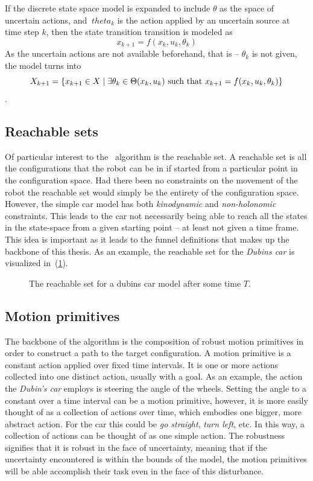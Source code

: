 If the discrete state space model is expanded to include \(\theta\) as the space
of uncertain actions, and \(\ theta_k\) is the action applied by an uncertain
source at time step \(k\), then the state transition transition is modeled as
\[
  x_{k+1} = f(x_k,u_k,\theta_k)
\]
As the uncertain actions are not available beforehand, that is -- \(\theta_ k\)
is not given, the model turns into
\[
  X_{k+1} = \lbrace x_{k+1} \in X \mid \exists\theta_k \in \Theta(x_k,u_k) \text{
      such that } x_{k+1} = f(x_k,u_k,\theta_k)\rbrace
\]\cite{Lav06}.

\subsection{Reachable sets}

Of particular interest to the \rrtfunnel\ algorithm is the reachable set. A
reachable set is all the configurations that the robot can be in if started from
a particular point in the configuration space. Had there been no constraints on
the movement of the robot the reachable set would simply be the entirety of the
configuration space. However, the simple car model has both \textit{kinodynamic}
and \textit{non-holonomic} constraints. This leads to the car not necessarily
being able to reach all the states in the state-space from a given starting
point -- at least not given a time frame. This idea is important as it leads to
the funnel definitions that makes up the backbone of this thesis. As an example,
the reachable set for the \textit{Dubins car} is visualized
in~(\ref{fig:reachable-set-dubin}).

\begin{figure}
  \centering 
  \caption{The reachable set for a dubins car model after some time \(T\).}
  \label{fig:reachable-set-dubin}
\end{figure}

\subsection{Motion primitives}

The backbone of the \rrtfunnel{} algorithm is the composition of robust motion
primitives in order to construct a path to the target configuration. A motion
primitive is a constant action applied over fixed time intervals. It is one or
more actions collected into one distinct action, usually with a goal. As an
example, the action the \textit{Dubin's car} employs is steering the angle of
the wheels. Setting the angle to a constant over a time interval can be a motion
primitive, however, it is more easily thought of as a collection of actions over
time, which embodies one bigger, more abstract action. For the car this could be
\textit{go straight}, \textit{turn left}, etc. In this way, a collection of
actions can be thought of as one simple action. The robustness signifies that it
is robust in the face of uncertainty, meaning that if the uncertainty
encountered is within the bounds of the model, the motion primitives will be
able accomplish their task even in the face of this disturbance.

